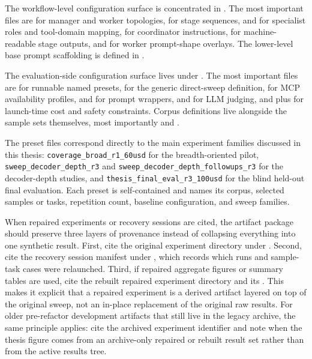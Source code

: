 The workflow-level configuration surface is concentrated in . The most important files are  for manager and worker topologies,  for stage sequences,  and  for specialist roles and tool-domain mapping,  for coordinator instructions,  for machine-readable stage outputs, and  for worker prompt-shape overlays. The lower-level base prompt scaffolding is defined in .

The evaluation-side configuration surface lives under . The most important files are  for runnable named presets,  for the generic direct-sweep definition,  for MCP availability profiles,  and  for prompt wrappers,  and  for LLM judging, and  plus  for launch-time cost and safety constraints. Corpus definitions live alongside the sample sets themselves, most importantly  and .

The preset files correspond directly to the main experiment families discussed in this thesis: \texttt{coverage\_broad\_r1\_60usd} for the breadth-oriented pilot, \texttt{sweep\_decoder\_depth\_r3} and \texttt{sweep\_decoder\_depth\_followups\_r3} for the decoder-depth studies, and \texttt{thesis\_final\_eval\_r3\_100usd} for the blind held-out final evaluation. Each preset is self-contained and names its corpus, selected samples or tasks, repetition count, baseline configuration, and sweep families.

When repaired experiments or recovery sessions are cited, the artifact package should preserve three layers of provenance instead of collapsing everything into one synthetic result. First, cite the original experiment directory under . Second, cite the recovery session manifest under , which records which runs and sample-task cases were relaunched. Third, if repaired aggregate figures or summary tables are used, cite the rebuilt repaired experiment directory and its . This makes it explicit that a repaired experiment is a derived artifact layered on top of the original sweep, not an in-place replacement of the original raw results. For older pre-refactor development artifacts that still live in the legacy archive, the same principle applies: cite the archived experiment identifier and note when the thesis figure comes from an archive-only repaired or rebuilt result set rather than from the active results tree.

